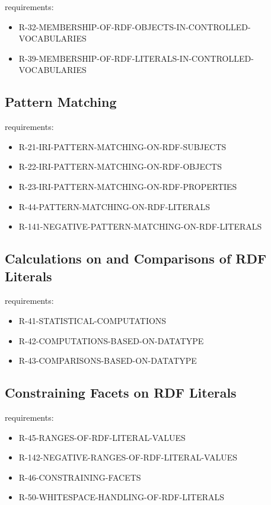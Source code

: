\documentclass{llncs}
\begin{document}
requirements:

\begin{itemize}
	\item R-32-MEMBERSHIP-OF-RDF-OBJECTS-IN-CONTROLLED-VOCABULARIES
	\item R-39-MEMBERSHIP-OF-RDF-LITERALS-IN-CONTROLLED-VOCABULARIES
\end{itemize}

\subsection{Pattern Matching}

requirements:

\begin{itemize}
	\item R-21-IRI-PATTERN-MATCHING-ON-RDF-SUBJECTS
  \item R-22-IRI-PATTERN-MATCHING-ON-RDF-OBJECTS
  \item R-23-IRI-PATTERN-MATCHING-ON-RDF-PROPERTIES
  \item R-44-PATTERN-MATCHING-ON-RDF-LITERALS
  \item R-141-NEGATIVE-PATTERN-MATCHING-ON-RDF-LITERALS
\end{itemize}

\subsection{Calculations on and Comparisons of RDF Literals}

requirements:

\begin{itemize}
	\item R-41-STATISTICAL-COMPUTATIONS
	\item R-42-COMPUTATIONS-BASED-ON-DATATYPE
	\item R-43-COMPARISONS-BASED-ON-DATATYPE
\end{itemize}

\subsection{Constraining Facets on RDF Literals}

requirements:

\begin{itemize}
	\item R-45-RANGES-OF-RDF-LITERAL-VALUES
  \item R-142-NEGATIVE-RANGES-OF-RDF-LITERAL-VALUES
	\item R-46-CONSTRAINING-FACETS
	\item R-50-WHITESPACE-HANDLING-OF-RDF-LITERALS
\end{itemize}
\end{document}
